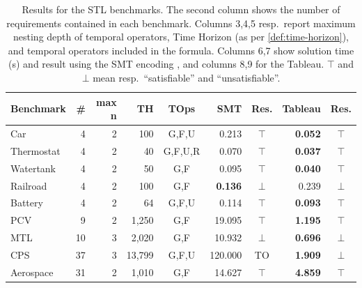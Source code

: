 \documentclass[acmsmall,screen]{acmart}
\begin{document}

\begin{table}
    \centering
    \caption{Results for the STL benchmarks.
    The second column shows the number of requirements contained in each benchmark.
    Columns 3,4,5 resp.\ report maximum nesting depth of temporal operators, Time Horizon (as per \ref{def:time-horizon}), and temporal operators included in the formula.
    Columns 6,7 show solution time (s) and result using the SMT encoding \cite{RamanDMMSS14}, and columns 8,9 for the Tableau.
    $\top$ and $\bot$ mean resp.\ ``satisfiable'' and ``unsatisfiable''.}
    \label{tab:execution_times}
    \footnotesize
    \begin{tabular}{l r r r c r c r c}
        \toprule
        \textbf{Benchmark} & \# & \textbf{max n} & \textbf{TH} & \textbf{TOps} & \textbf{SMT} & \textbf{Res.} & \textbf{Tableau} & \textbf{Res.} \\
        \midrule
        Car \cite{BaeLee19} & 4 & 2 & 100 & G,F,U & 0.213 & $\top$ & \textbf{0.052} & $\top$\\
        Thermostat \cite{BaeLee19} & 4 & 2 & 40 & G,F,U,R & 0.070 & $\top$  & \textbf{0.037} & $\top$  \\
        Watertank \cite{BaeLee19} & 4 & 2 & 50 & G,F & 0.095 & $\top$ & \textbf{0.040} & $\top$\\
        Railroad \cite{BaeLee19} & 4 & 2 & 100 & G,F & \textbf{0.136} & $\bot$ & 0.239 & $\bot$ \\
        Battery \cite{BaeLee19} & 4 & 2 & 64 & G,F,U & 0.114 & $\top$ & \textbf{0.093} & $\top$ \\
        PCV \cite{pcv} & 9 & 2 & 1,250 & G,F & 19.095 & $\top$ & \textbf{1.195} & $\top$\\
        MTL \cite{Benchmarks_Temporal_Logic_Requirements} & 10 & 3 & 2,020 & G,F & 10.932 & $\bot$ & \textbf{0.696} & $\bot$ \\
        CPS \cite{BoufaiedJBBP21} & 37 & 3 & 13,799 & G,F,U & 120.000 & TO & \textbf{1.909} & $\bot$\\
        Aerospace & 31 & 2 & 1,010 & G,F & 14.627 & $\top$ & \textbf{4.859} & $\top$ \\
        \bottomrule
    \end{tabular}
\end{table}
\end{document}
